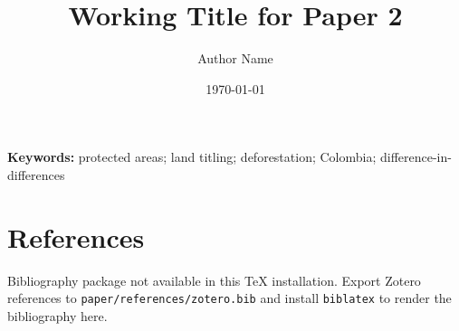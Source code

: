 \documentclass[12pt]{article}
\title{Working Title for Paper 2}
\author{Author Name}
\date{\today}
\newcommand{\printbibliography}{%
        \section*{References}
        Bibliography package not available in this TeX installation. Export Zotero references to
        \texttt{paper/references/zotero.bib} and install \texttt{biblatex} to render the bibliography here.
    }
\newcommand{\1}{\mathbf{1}}
\begin{document}
\maketitle



\noindent\textbf{Keywords:} protected areas; land titling; deforestation; Colombia; difference-in-differences

\newpage
\tableofcontents
\newpage









\appendix


\newpage
\printbibliography
\end{document}
